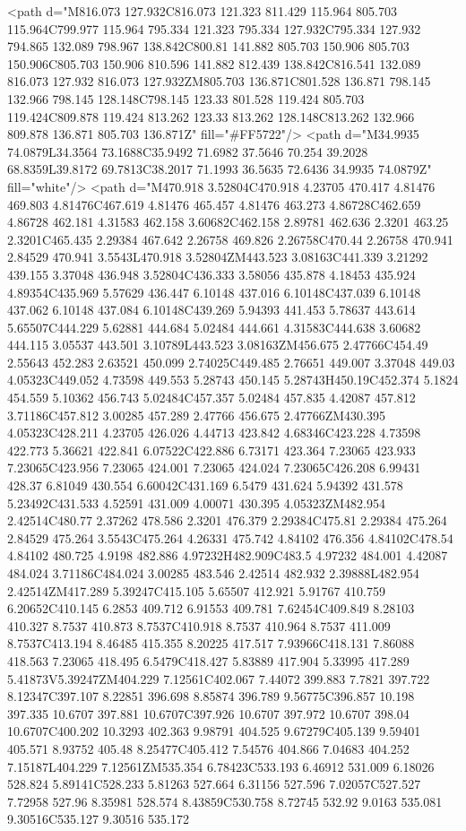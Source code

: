 <path d="M816.073 127.932C816.073 121.323 811.429 115.964 805.703 115.964C799.977 115.964 795.334 121.323 795.334 127.932C795.334 127.932 794.865 132.089 798.967 138.842C800.81 141.882 805.703 150.906 805.703 150.906C805.703 150.906 810.596 141.882 812.439 138.842C816.541 132.089 816.073 127.932 816.073 127.932ZM805.703 136.871C801.528 136.871 798.145 132.966 798.145 128.148C798.145 123.33 801.528 119.424 805.703 119.424C809.878 119.424 813.262 123.33 813.262 128.148C813.262 132.966 809.878 136.871 805.703 136.871Z" fill="#FF5722"/>
<path d="M34.9935 74.0879L34.3564 73.1688C35.9492 71.6982 37.5646 70.254 39.2028 68.8359L39.8172 69.7813C38.2017 71.1993 36.5635 72.6436 34.9935 74.0879Z" fill="white"/>
<path d="M470.918 3.52804C470.918 4.23705 470.417 4.81476 469.803 4.81476C467.619 4.81476 465.457 4.81476 463.273 4.86728C462.659 4.86728 462.181 4.31583 462.158 3.60682C462.158 2.89781 462.636 2.3201 463.25 2.3201C465.435 2.29384 467.642 2.26758 469.826 2.26758C470.44 2.26758 470.941 2.84529 470.941 3.5543L470.918 3.52804ZM443.523 3.08163C441.339 3.21292 439.155 3.37048 436.948 3.52804C436.333 3.58056 435.878 4.18453 435.924 4.89354C435.969 5.57629 436.447 6.10148 437.016 6.10148C437.039 6.10148 437.062 6.10148 437.084 6.10148C439.269 5.94393 441.453 5.78637 443.614 5.65507C444.229 5.62881 444.684 5.02484 444.661 4.31583C444.638 3.60682 444.115 3.05537 443.501 3.10789L443.523 3.08163ZM456.675 2.47766C454.49 2.55643 452.283 2.63521 450.099 2.74025C449.485 2.76651 449.007 3.37048 449.03 4.05323C449.052 4.73598 449.553 5.28743 450.145 5.28743H450.19C452.374 5.1824 454.559 5.10362 456.743 5.02484C457.357 5.02484 457.835 4.42087 457.812 3.71186C457.812 3.00285 457.289 2.47766 456.675 2.47766ZM430.395 4.05323C428.211 4.23705 426.026 4.44713 423.842 4.68346C423.228 4.73598 422.773 5.36621 422.841 6.07522C422.886 6.73171 423.364 7.23065 423.933 7.23065C423.956 7.23065 424.001 7.23065 424.024 7.23065C426.208 6.99431 428.37 6.81049 430.554 6.60042C431.169 6.5479 431.624 5.94392 431.578 5.23492C431.533 4.52591 431.009 4.00071 430.395 4.05323ZM482.954 2.42514C480.77 2.37262 478.586 2.3201 476.379 2.29384C475.81 2.29384 475.264 2.84529 475.264 3.5543C475.264 4.26331 475.742 4.84102 476.356 4.84102C478.54 4.84102 480.725 4.9198 482.886 4.97232H482.909C483.5 4.97232 484.001 4.42087 484.024 3.71186C484.024 3.00285 483.546 2.42514 482.932 2.39888L482.954 2.42514ZM417.289 5.39247C415.105 5.65507 412.921 5.91767 410.759 6.20652C410.145 6.2853 409.712 6.91553 409.781 7.62454C409.849 8.28103 410.327 8.7537 410.873 8.7537C410.918 8.7537 410.964 8.7537 411.009 8.7537C413.194 8.46485 415.355 8.20225 417.517 7.93966C418.131 7.86088 418.563 7.23065 418.495 6.5479C418.427 5.83889 417.904 5.33995 417.289 5.41873V5.39247ZM404.229 7.12561C402.067 7.44072 399.883 7.7821 397.722 8.12347C397.107 8.22851 396.698 8.85874 396.789 9.56775C396.857 10.198 397.335 10.6707 397.881 10.6707C397.926 10.6707 397.972 10.6707 398.04 10.6707C400.202 10.3293 402.363 9.98791 404.525 9.67279C405.139 9.59401 405.571 8.93752 405.48 8.25477C405.412 7.54576 404.866 7.04683 404.252 7.15187L404.229 7.12561ZM535.354 6.78423C533.193 6.46912 531.009 6.18026 528.824 5.89141C528.233 5.81263 527.664 6.31156 527.596 7.02057C527.527 7.72958 527.96 8.35981 528.574 8.43859C530.758 8.72745 532.92 9.0163 535.081 9.30516C535.127 9.30516 535.172 